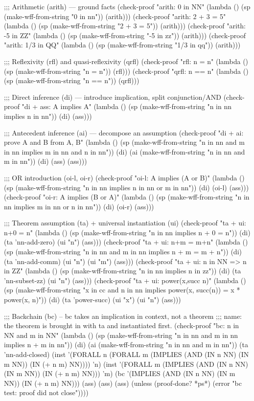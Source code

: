 \begin{VNBcode}
;;; Arithmetic (arith) — ground facts
(check-proof "arith: 0 in NN"
  (lambda () (sp (make-wff-from-string "0 in nn")) (arith)))
(check-proof "arith: 2 + 3 = 5"
  (lambda () (sp (make-wff-from-string "2 + 3 = 5")) (arith)))
(check-proof "arith: -5 in ZZ"
  (lambda () (sp (make-wff-from-string "-5 in zz")) (arith)))
(check-proof "arith: 1/3 in QQ"
  (lambda () (sp (make-wff-from-string "1/3 in qq")) (arith)))

;;; Reflexivity (rfl) and quasi-reflexivity (qrfl)
(check-proof "rfl: n = n"
  (lambda () (sp (make-wff-from-string "n = n")) (rfl)))
(check-proof "qrfl: n == n"
  (lambda () (sp (make-wff-from-string "n == n")) (qrfl)))

;;; Direct inference (di) — introduce implication, split conjunction/AND
(check-proof "di + ass: A implies A"
  (lambda ()
    (sp (make-wff-from-string "n in nn implies n in nn"))
    (di) (ass)))

;;; Antecedent inference (ai) — decompose an assumption
(check-proof "di + ai: prove A and B from A, B"
  (lambda ()
    (sp (make-wff-from-string "n in nn and m in nn implies m in nn and n in nn"))
    (di)
    (ai (make-wff-from-string "n in nn and m in nn"))
    (di) (ass) (ass)))

;;; OR introduction (oi-l, oi-r)
(check-proof "oi-l: A implies (A or B)"
  (lambda ()
    (sp (make-wff-from-string "n in nn implies n in nn or m in nn"))
    (di) (oi-l) (ass)))
(check-proof "oi-r: A implies (B or A)"
  (lambda ()
    (sp (make-wff-from-string "n in nn implies m in nn or n in nn"))
    (di) (oi-r) (ass)))

;;; Theorem assumption (ta) + universal instantiation (ui)
(check-proof "ta + ui: n+0 = n"
  (lambda ()
    (sp (make-wff-from-string "n in nn implies n + 0 = n"))
    (di) (ta 'nn-add-zero) (ui "n") (ass)))
(check-proof "ta + ui: n+m = m+n"
  (lambda ()
    (sp (make-wff-from-string "n in nn and m in nn implies n + m = m + n"))
    (di) (ta 'nn-add-comm) (ui "n") (ui "m") (ass)))
(check-proof "ta + ui: n in NN => n in ZZ"
  (lambda ()
    (sp (make-wff-from-string "n in nn implies n in zz"))
    (di) (ta 'nn-subset-zz) (ui "n") (ass)))
(check-proof "ta + ui: power(x,succ n)"
  (lambda ()
    (sp (make-wff-from-string
          "x in cc and n in nn implies power(x, succ(n)) = x * power(x, n)"))
    (di) (ta 'power-succ) (ui "x") (ui "n") (ass)))

;;; Backchain (bc) -- bc takes an implication in context, not a theorem
;;; name: the theorem is brought in with ta and instantiated first.
(check-proof "bc: n in NN and m in NN"
  (lambda ()
    (sp (make-wff-from-string "n in nn and m in nn implies n + m in nn"))
    (di) (ai (make-wff-from-string "n in nn and m in nn"))
    (ta 'nn-add-closed)
    (inst '(FORALL n (FORALL m (IMPLIES (AND (IN n NN) (IN m NN)) (IN (+ n m) NN)))) 'n)
    (inst '(FORALL m (IMPLIES (AND (IN n NN) (IN m NN)) (IN (+ n m) NN))) 'm)
    (bc '(IMPLIES (AND (IN n NN) (IN m NN)) (IN (+ n m) NN)))
    (ass) (ass) (ass)
    (unless (proof-done? *ps*) (error "bc test: proof did not close"))))


\end{VNBcode}
